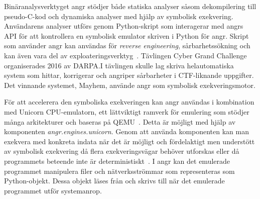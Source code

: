 Binäranalysverktyget angr stödjer både statiska analyser såsom dekompilering
till pseudo-C-kod och dynamiska analyser med hjälp av symbolisk exekvering.
Användarens analyser utförs genom Python-skript som interagerar med angrs API
för att kontrollera en symbolisk emulator skriven i Python för angr. Skript som
använder angr kan användas för \emph{reverse engineering}, sårbarhetssökning och
kan även vara del av exploateringsverktyg~\cite{angr_docs}. Tävlingen Cyber
Grand Challenge organiserades 2016 av DARPA.\@ I tävlingen skulle lag skriva
helautomatiska system som hittar, korrigerar och angriper sårbarheter i
CTF-liknande uppgifter.  Det vinnande systemet, Mayhem, använde angr som
symbolisk exekveringsmotor.

För att accelerera den symboliska exekveringen kan angr användas i kombination
med Unicorn CPU-emulatorn, ett lättviktigt ramverk för emulering som stödjer
många arkitekturer och baseras på QEMU~\cite{UnicornEngine}. Detta är möjligt
med hjälp av komponenten \emph{angr.engines.unicorn}. Genom att använda
komponenten kan man exekvera med konkreta indata när det är möjligt och
fördelaktigt men understött av symbolisk exekvering då flera exekveringsvägar
behöver utforskas eller då programmets beteende inte är
deterministiskt~\cite{angrUnicornEngine}. I angr kan det emulerade programmet
manipulera filer och nätverksströmmar som representeras som Python-objekt. Dessa
objekt läses från och skrivs till när det emulerade programmet utför
systemanrop.
